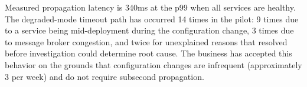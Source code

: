 Measured propagation latency is 340ms at the p99 when all services are healthy. The degraded-mode timeout path has occurred 14 times in the pilot: 9 times due to a service being mid-deployment during the configuration change, 3 times due to message broker congestion, and twice for unexplained reasons that resolved before investigation could determine root cause. The business has accepted this behavior on the grounds that configuration changes are infrequent (approximately 3 per week) and do not require subsecond propagation.
